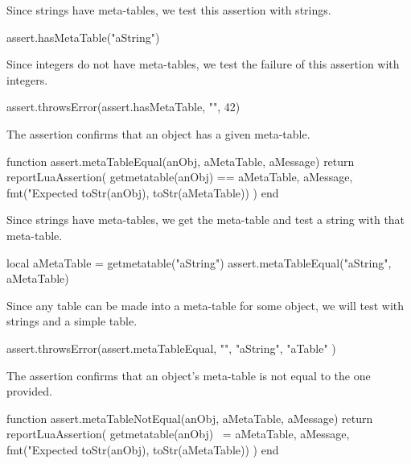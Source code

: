 Since strings have meta-tables, we test this assertion with strings.

\startLuaTest
  assert.hasMetaTable("aString")
\stopLuaTest
\stopTestCase


Since integers do not have meta-tables, we test the failure of this 
assertion with integers. 

\startLuaTest
  assert.throwsError(assert.hasMetaTable, "", 42)
\stopLuaTest
\stopTestCase

\stopTestSuite


The  assertion confirms that an object has a 
given meta-table. 

\startLuaCode
function assert.metaTableEqual(anObj, aMetaTable, aMessage)
  return reportLuaAssertion(
    getmetatable(anObj) == aMetaTable,
    aMessage,
    fmt("Expected %
      toStr(anObj), toStr(aMetaTable))
  )
end
\stopLuaCode


Since strings have meta-tables, we get the meta-table and test a string 
with that meta-table. 

\startLuaTest
  local aMetaTable = getmetatable("aString")
  assert.metaTableEqual("aString", aMetaTable)
\stopLuaTest
\stopTestCase


Since any table can be made into a meta-table for some object, we will 
test with strings and a simple table. 

\startLuaTest
  assert.throwsError(assert.metaTableEqual, "",
    "aString", { "aTable" })
\stopLuaTest
\stopTestCase

\stopTestSuite


The  assertion confirms that an object's 
meta-table is not equal to the one provided. 

\startLuaCode
function assert.metaTableNotEqual(anObj, aMetaTable, aMessage)
  return reportLuaAssertion(
    getmetatable(anObj) ~= aMetaTable,
    aMessage,
    fmt("Expected %
      toStr(anObj), toStr(aMetaTable))
  )
end
\stopLuaCode

